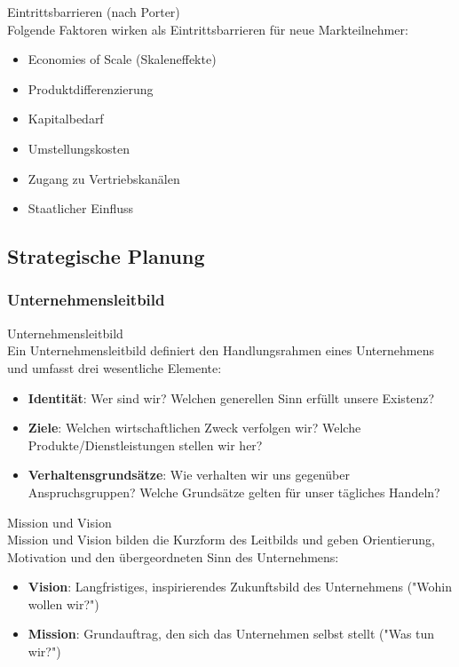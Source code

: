 \begin{concept}{Eintrittsbarrieren (nach Porter)}\\
Folgende Faktoren wirken als Eintrittsbarrieren für neue Markteilnehmer:
\begin{itemize}
    \item Economies of Scale (Skaleneffekte)
    \item Produktdifferenzierung
    \item Kapitalbedarf
    \item Umstellungskosten
    \item Zugang zu Vertriebskanälen
    \item Staatlicher Einfluss
\end{itemize}
\end{concept}

\subsection{Strategische Planung}

\subsubsection{Unternehmensleitbild}

\begin{definition}{Unternehmensleitbild}\\
Ein Unternehmensleitbild definiert den Handlungsrahmen eines Unternehmens und umfasst drei wesentliche Elemente:
\begin{itemize}
    \item \textbf{Identität}: Wer sind wir? Welchen generellen Sinn erfüllt unsere Existenz?
    \item \textbf{Ziele}: Welchen wirtschaftlichen Zweck verfolgen wir? Welche Produkte/Dienstleistungen stellen wir her?
    \item \textbf{Verhaltensgrundsätze}: Wie verhalten wir uns gegenüber Anspruchsgruppen? Welche Grundsätze gelten für unser tägliches Handeln?
\end{itemize}
\end{definition}

\begin{concept}{Mission und Vision}\\
Mission und Vision bilden die Kurzform des Leitbilds und geben Orientierung, Motivation und den übergeordneten Sinn des Unternehmens:
\begin{itemize}
    \item \textbf{Vision}: Langfristiges, inspirierendes Zukunftsbild des Unternehmens ("Wohin wollen wir?")
    \item \textbf{Mission}: Grundauftrag, den sich das Unternehmen selbst stellt ("Was tun wir?")
\end{itemize}
\end{concept}

